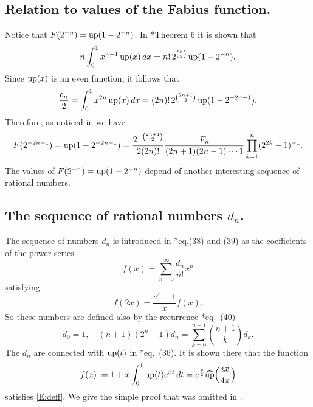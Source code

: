 \documentclass[10pt]{amsart}
\theoremstyle{definition}
\theoremstyle{remark}
\begin{document}
\subsection{Relation to  values of the Fabius function.}
Notice that $F(2^{-n})=\operatorname{up}(1-2^{-n})$.
In \cite{MR666839}*{Theorem 6} it is shown that
\begin{equation}
n\int_0^1x^{n-1}\operatorname{up}(x)\,dx=n!\,2^{\binom{n}{2}}\operatorname{up}(1-2^{-n}).
\end{equation}
Since $\operatorname{up}(x)$ is an even function, it follows that
\begin{equation}
\frac{c_n}{2}=\int_0^1x^{2n}\operatorname{up}(x)\,dx=(2n)!\,2^{\binom{2n+1}{2}}
\operatorname{up}(1-2^{-2n-1}).
\end{equation}
Therefore, as noticed in \cite{MR666839} we have
\begin{equation}\label{E:35}
F(2^{-2n-1})=\operatorname{up}(1-2^{-2n-1})=\frac{2^{-\binom{2n+1}{2}}}{2 (2n)!}\frac{F_n}{(2n+1)(2n-1)\cdots1}
\prod_{k=1}^n(2^{2k}-1)^{-1}.
\end{equation}
The values of $F(2^{-n})=\operatorname{up}(1-2^{-n})$ depend of another interesting sequence of
rational numbers.

\subsection{The sequence of rational  numbers $d_n$.}
The sequence of numbers $d_n$ is introduced in  \cite{MR666839}*{eq.(38) and (39)}
as the coefficients of the power series
\begin{equation}\label{E:dexpan}
f(x)=\sum_{n=0}^\infty \frac{d_n}{n!}x^n
\end{equation}
satisfying
\begin{equation}\label{E:deff}
f(2x)=\frac{e^x-1}{x}f(x).
\end{equation}
So these numbers are defined also by the recurrence \cite{MR666839}*{eq.~(40)}
\begin{equation}\label{E:d-recur}
d_0=1,\quad (n+1)(2^n-1)d_n=\sum_{k=0}^{n-1}\binom{n+1}{k}d_k.
\end{equation}
The $d_n$ are connected with $\operatorname{up}(t)$ in  \cite{MR666839}*{eq.~(36)}.
It is shown there that the function
\begin{equation}\label{E:gooddef}
f(x):=1+x\int_0^1\operatorname{up}(t)e^{xt}\,dt=e^{\frac{x}{2}}\widehat{\operatorname{up}}
\Bigl(\frac{ix}{4\pi}\Bigr)
\end{equation}
satisfies \eqref{E:deff}. We give the simple proof that was omitted in
\cite{MR666839}.
\end{document}
